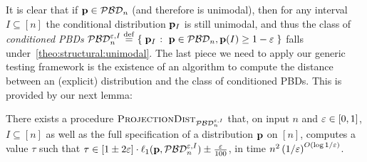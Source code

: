 It is clear that if $\D\in\classpbd[n]$ (and therefore is unimodal), then for any interval $I\subseteq[n]$ the conditional distribution $\D_I$ is still unimodal, and thus the class of \emph{conditioned PBDs} $\classpbd[n]^{\eps,I}\eqdef \setOfSuchThat{\D_I}{\D\in\classpbd[n], \D(I) \geq 1-\eps}$ falls under~\cref{theo:structural:unimodal}. The last piece we need to apply our generic testing framework is the existence of an algorithm to compute the distance between an (explicit) distribution and the class of conditioned PBDs. This is provided by our next lemma:
\begin{claim}\label{lemma:distance:pbd}
There exists a procedure $\estimdist[{\classpbd[n]^{\eps,I}}]$ that, on input $n$ and $\eps \in [0,1]$, $I\subseteq[n]$ as well as the full specification of a distribution $\D$ on $[n]$, computes a value $\tau$ such that $\tau \in [1\pm 2\eps] \cdot \lp[1](\D,\classpbd[n]^{\eps,I}) \pm \frac{\eps}{100}$, in time $n^2 \left( {1/\eps} \right)^{\bigO{\log{1/\eps}}}$.
\end{claim}
